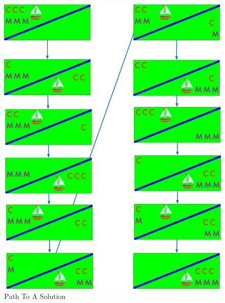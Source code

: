 \documentclass[12pt]{scrartcl}
\begin{document}
\begin{figure}[htpb]
    \centering
    \includegraphics[width=.9\textwidth]{./assets/2.2-diagram.png}
    \caption{Path To A Solution}\label{fig:success}
\end{figure}
\end{document}
